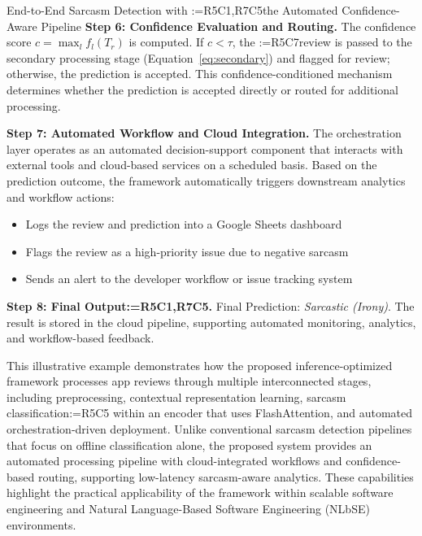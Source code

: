 \documentclass[a4paper,fleqn]{cas-sc}
\makeatletter
\newif\iftracked
\newcommand{\rv@setcolour}[1]{%
  \IfStrEq{#1}{R7C7}{\color{rvEdit}}{%
    \IfSubStr{#1}{R5}{\IfSubStr{#1}{R7}{\color{rvBoth}}{\color{rvFive}}}{\color{rvSeven}}}}
\newcommand{\rv@tag}[1]{\textsuperscript{\sffamily\bfseries\scriptsize[\StrSubstitute{#1}{,}{, }]}\,}
\newcommand{\rv@recordone}[1]{%
  \edef\rv@i{#1}%
  \ifcsdef{rv@n@\rv@i}{}{\csgdef{rv@n@\rv@i}{0}}%
  \csxdef{rv@n@\rv@i}{\the\numexpr\csuse{rv@n@\rv@i}+1\relax}%
  \begingroup\edef\@currentlabel{\rv@i}\label{rv:\rv@i:\csuse{rv@n@\rv@i}}\endgroup}
\newcommand{\rv@record}[1]{\@for\rv@id:=#1\do{\expandafter\rv@recordone\expandafter{\rv@id}}}
\DeclareRobustCommand{\rcdel}[2]{\rv@record{#1}\iftracked{\rv@setcolour{#1}\rv@tag{#1}\rv@strike{#2}}\else\unskip\fi}
\DeclareRobustCommand{\rcrep}[3]{\rv@record{#1}\iftracked{\rv@setcolour{#1}\rv@tag{#1}\rv@strike{#2} #3}\else#3\fi}
\makeatother
\begin{document}
\begin{examplebox}{End-to-End Sarcasm Detection with \rcrep{R5C1,R7C5}{Agentic Pipeline}{the Automated Confidence-Aware Pipeline}}
\medskip\textbf{Step 6: Confidence Evaluation and Routing.} The confidence score $c = \max_l f_l(T_r)$ is computed. If $c < \tau$, the \rcrep{R5C7}{verification model (Equation (20)) is triggered}{review is passed to the secondary processing stage (Equation~\eqref{eq:secondary}) and flagged for review}; otherwise, the prediction is accepted. This confidence-conditioned mechanism determines whether the prediction is accepted directly or routed for additional processing.

\medskip\textbf{Step 7: Automated Workflow and Cloud Integration.} The orchestration layer operates as an automated decision-support component that interacts with external tools and cloud-based services on a scheduled basis. Based on the prediction outcome, the framework automatically triggers downstream analytics and workflow actions:
\begin{itemize}
\item Logs the review and prediction into a Google Sheets dashboard
\item Flags the review as a high-priority issue due to negative sarcasm
\item Sends an alert to the developer workflow or issue tracking system
\end{itemize}

\medskip\textbf{Step 8: Final Output\rcdel{R5C1,R7C5}{and Continuous Feedback}.} Final Prediction: \textit{Sarcastic (Irony)}. The result is stored in the cloud pipeline, supporting automated monitoring, analytics, and workflow-based feedback.
\end{examplebox}

This illustrative example demonstrates how the proposed inference-optimized framework processes app reviews through multiple interconnected stages, including preprocessing, contextual representation learning, sarcasm classification\rcrep{R5C5}{, FlashAttention-based efficiency optimization,}{ within an encoder that uses FlashAttention,} and automated orchestration-driven deployment. Unlike conventional sarcasm detection pipelines that focus on offline classification alone, the proposed system provides an automated processing pipeline with cloud-integrated workflows and confidence-based routing, supporting low-latency sarcasm-aware analytics. These capabilities highlight the practical applicability of the framework within scalable software engineering and Natural Language-Based Software Engineering (NLbSE) environments.

\end{document}
